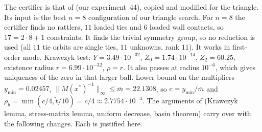 \documentclass[11pt]{amsart}
\theoremstyle{definition}
\begin{document}
The certifier is that of \cite[Sec.~2.1 and App.~B]{N9} (our experiment~44), copied and modified for the triangle. Its input is the best $n = 8$ configuration of our triangle search. %
For $n = 8$ the certifier finds no rattlers, $11$ loaded ties and $6$ loaded wall contacts, so $17 = 2\cdot 8 + 1$ constraints. It finds the trivial symmetry group, so no reduction is used (all $11$ tie orbits are single ties, $11$ unknowns, rank $11$). It works in first-order mode. Krawczyk test: $Y = 3.49\cdot10^{-32}$, $Z_0 = 1.74\cdot10^{-14}$, $Z_2 = 60.25$, existence radius $r = 6.99\cdot10^{-32}$, $\rho = r$. It also passes at radius $10^{-6}$, which gives uniqueness of the zero in that larger ball. Lower bound on the multipliers $y_{\min} = 0.02457$, $\|M(x^*)^{-1}\|_\infty \le \bar m = 22.1308$, so $c = y_{\min}/\bar m$ and $\rho_b = \min(c/4, \tilde t/10) = c/4 \approx 2.7754\cdot10^{-4}$. %
The arguments of \cite[App.~B]{N9} (Krawczyk lemma, stress-matrix lemma, uniform decrease, basin theorem) carry over with the following changes. Each is justified here.
\end{document}
